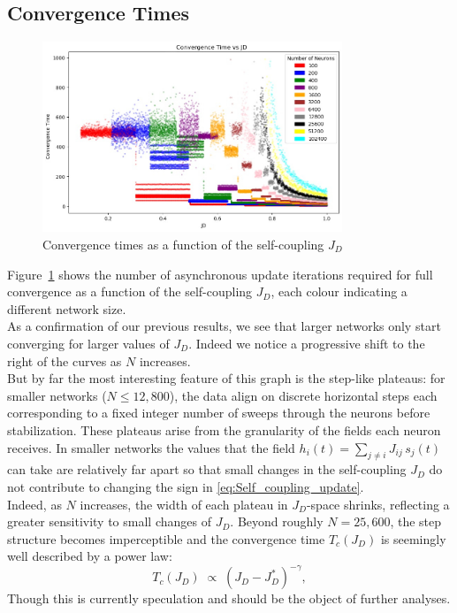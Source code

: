 \documentclass[a4paper,12pt]{report}
\begin{document}
\subsection*{Convergence Times}

\begin{figure}[h!]
  \centering
  \includegraphics[width=0.8\textwidth]{pictures/Average_conv_time.jpg}
  \caption{Convergence times as a function of the self-coupling $J_D$}
  \label{fig:average_convergence_time_vs_JD}
\end{figure}

Figure~\ref{fig:average_convergence_time_vs_JD} shows the number of asynchronous update iterations required 
for full convergence as a function of the self-coupling \(J_D\), each colour 
indicating a different network size. \\
As a confirmation of our previous results, we see that larger networks only start 
converging for larger values of \(J_D\). Indeed we notice a progressive shift to the 
right of the curves as \(N\) increases. \\
But by far the most interesting feature of this graph is the step-like plateaus: 
for smaller networks (\(N\leq 12{,}800\)), the data align on discrete horizontal 
steps each corresponding to a fixed integer number of sweeps through the neurons 
before stabilization. These plateaus arise from the granularity of the fields each 
neuron receives. In smaller networks the values that the field 
$h_i(t) = \sum_{j\neq i} J_{ij}\,s_j(t)$ can take are relatively far apart so that small 
changes in the self-coupling $J_D$ do not contribute to changing the sign in 
\ref{eq:Self_coupling_update}. \\
Indeed, as \(N\) increases, the width of each plateau in \(J_D\)-space shrinks, 
reflecting a greater sensitivity to small changes of $J_D$. Beyond roughly 
\(N=25{,}600\), the step structure becomes imperceptible and the convergence time 
\(T_c(J_D)\) is seemingly well described by a power law:
\[
  T_c(J_D)\;\propto\;(J_D - J_D^*)^{-\gamma},
\]
Though this is currently speculation and should be the object of further analyses.
\end{document}
